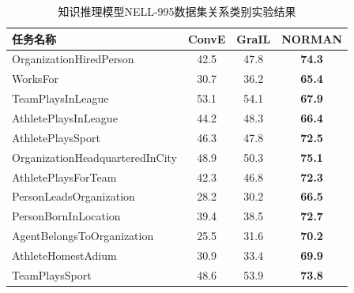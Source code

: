 \documentclass[algorithmlist, AutoFakeBold, AutoFakeSlant, figurelist, tablelist, nomlist, engineering]{seuthesix}
\begin{document}
\begin{table}[]
  \centering
  \begin{tabular*}{0.95\textwidth}{@{\extracolsep{\fill}}lccc}
  \toprule[1pt]
  \small{任务名称} & \small{ConvE} & \small{GraIL} & \small{NORMAN} \\ \hline
  \small{OrganizationHiredPerson} & 42.5 & 47.8 & \textbf{74.3} \\
  \small{WorksFor} & 30.7 & 36.2 & \textbf{65.4} \\
  \small{TeamPlaysInLeague} & 53.1 & 54.1 & \textbf{67.9} \\
  \small{AthletePlaysInLeague} & 44.2 & 48.3 & \textbf{66.4} \\
  \small{AthletePlaysSport} & 46.3 & 47.8 & \textbf{72.5} \\
  \small{OrganizationHeadquarteredInCity} & 48.9 & 50.3 & \textbf{75.1} \\
  \small{AthletePlaysForTeam} & 42.3 & 46.8 & \textbf{72.3} \\
  \small{PersonLeadsOrganization} & 28.2 & 30.2 & \textbf{66.5} \\
  \small{PersonBornInLocation} & 39.4 & 38.5 & \textbf{72.7} \\
  \small{AgentBelongsToOrganization} & 25.5 & 31.6 & \textbf{70.2} \\
  \small{AthleteHomestAdium} & 30.9 & 33.4 & \textbf{69.9} \\
  \small{TeamPlaysSport} & 48.6 & 53.9 & \textbf{73.8} \\
  \bottomrule[1pt]
  \end{tabular*}
  \caption{知识推理模型NELL-995数据集关系类别实验结果}
  \label{Experiment1_tasks2}
\end{table}
\end{document}
